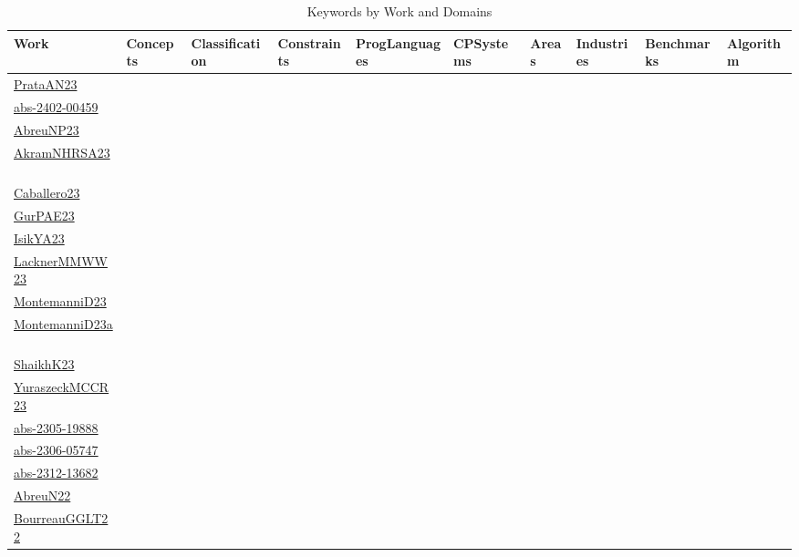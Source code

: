{\scriptsize
\begin{longtable}{p{3cm}p{4cm}p{2cm}p{2cm}p{2cm}p{2cm}p{2cm}p{2cm}p{2cm}p{2cm}}
\caption{Keywords by Work and Domains}\\ \toprule
Work & Concepts & Classification & Constraints & ProgLanguages & CPSystems & Areas & Industries & Benchmarks & Algorithm\\ \midrule\endhead
\bottomrule
\endfoot
\href{articles/PrataAN23.pdf}{PrataAN23}~\cite{PrataAN23} &  &  &  &  &  &  &  &  & \\
\href{articles/abs-2402-00459.pdf}{abs-2402-00459}~\cite{abs-2402-00459} &  &  &  &  &  &  &  &  & \\
\href{}{AbreuNP23}~\cite{AbreuNP23} &  &  &  &  &  &  &  &  & \\
\href{articles/AkramNHRSA23.pdf}{AkramNHRSA23}~\cite{AkramNHRSA23} &  &  &  &  &  &  &  &  & \\
\href{articles/Caballero23.pdf}{Caballero23}~\cite{Caballero23} &  &  &  &  &  &  &  &  & \\
\href{articles/GurPAE23.pdf}{GurPAE23}~\cite{GurPAE23} &  &  &  &  &  &  &  &  & \\
\href{articles/IsikYA23.pdf}{IsikYA23}~\cite{IsikYA23} &  &  &  &  &  &  &  &  & \\
\href{articles/LacknerMMWW23.pdf}{LacknerMMWW23}~\cite{LacknerMMWW23} &  &  &  &  &  &  &  &  & \\
\href{articles/MontemanniD23.pdf}{MontemanniD23}~\cite{MontemanniD23} &  &  &  &  &  &  &  &  & \\
\href{articles/MontemanniD23a.pdf}{MontemanniD23a}~\cite{MontemanniD23a} &  &  &  &  &  &  &  &  & \\
\href{}{ShaikhK23}~\cite{ShaikhK23} &  &  &  &  &  &  &  &  & \\
\href{articles/YuraszeckMCCR23.pdf}{YuraszeckMCCR23}~\cite{YuraszeckMCCR23} &  &  &  &  &  &  &  &  & \\
\href{articles/abs-2305-19888.pdf}{abs-2305-19888}~\cite{abs-2305-19888} &  &  &  &  &  &  &  &  & \\
\href{articles/abs-2306-05747.pdf}{abs-2306-05747}~\cite{abs-2306-05747} &  &  &  &  &  &  &  &  & \\
\href{articles/abs-2312-13682.pdf}{abs-2312-13682}~\cite{abs-2312-13682} &  &  &  &  &  &  &  &  & \\
\href{articles/AbreuN22.pdf}{AbreuN22}~\cite{AbreuN22} &  &  &  &  &  &  &  &  & \\
\href{}{BourreauGGLT22}~\cite{BourreauGGLT22} &  &  &  &  &  &  &  &  & \\

\end{longtable}}
